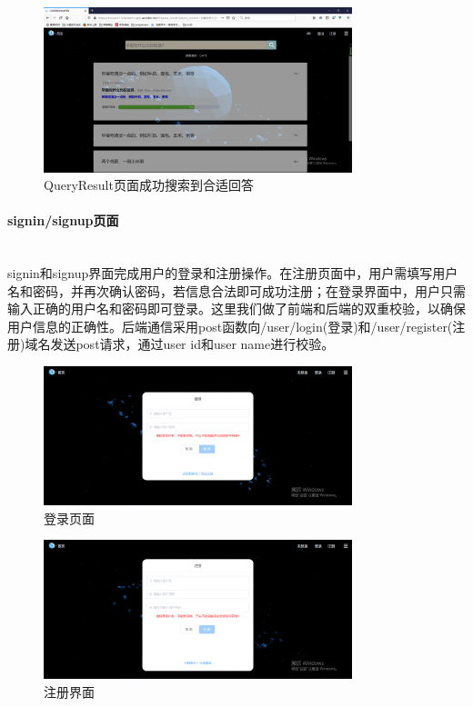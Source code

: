 \documentclass[12pt]{article}
\newcommand{\myparagraph}[1]{\paragraph{#1}\mbox{}\\}
\begin{document}
\begin{figure}[htbp]  %
    \centering  %
    \includegraphics[width=0.8\textwidth]{fig/search1.PNG}  %
    \caption{QueryResult页面成功搜索到合适回答}  %
    \label{fig:structure}  %
\end{figure}

\myparagraph{signin/signup页面}

signin和signup界面完成用户的登录和注册操作。在注册页面中，用户需填写用户名和密码，并再次确认密码，若信息合法即可成功注册；在登录界面中，用户只需输入正确的用户名和密码即可登录。这里我们做了前端和后端的双重校验，以确保用户信息的正确性。后端通信采用post函数向/user/login(登录)和/user/register(注册)域名发送post请求，通过user id和user name进行校验。

\begin{figure}[htbp]  %
    \centering  %
    \includegraphics[width=0.8\textwidth]{fig/login.png}  %
    \caption{登录页面}  %
    \label{fig:structure}  %
\end{figure}

\begin{figure}[htbp]  %
    \centering  %
    \includegraphics[width=0.8\textwidth]{fig/signup.png}  %
    \caption{注册界面}  %
    \label{fig:structure}  %
\end{figure}
\end{document}
